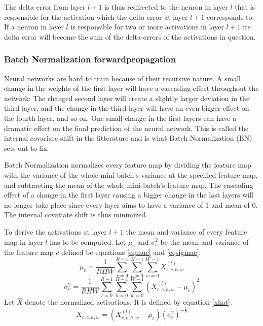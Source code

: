 \documentclass[a4paper,11pt,twoside]{article}
\begin{document}
The delta-error from layer $l+1$ is thus redirected to the neuron in layer $l$ that is responsible for the activation which the delta error at layer $l+1$ corresponds to. If a neuron in layer $l$ is responsible for two or more activations in layer $l+1$ its delta error will become the sum of the delta-errors of the activations in question. \cite{cs231n} \cite{convmath} \cite{webconv3}

\subsubsection{Batch Normalization forwardpropagation}
Neural networks are hard to train because of their recursive nature. A small change in the weights of the first layer will have a cascading effect throughout the network: The changed second layer will create a slightly larger deviation in the third layer, and the change in the third layer will have an even bigger effect on the fourth layer, and so on. One small change in the first layers can have a dramatic effect on the final prediction of the neural network. This is called  the internal covariate shift in the litterature and is what Batch Normalization (BN) sets out to fix. \cite{cs231n} \cite{batchnorm}

Batch Normalization normalizes every feature map by dividing the feature map with the variance of the whole mini-batch's variance at the specified feature map, and subtracting the mean of the whole mini-batch's feature map. The cascading effect of a change in the first layer causing a bigger change in the last layers will no longer take place since every layer aims to have a variance of 1 and mean of 0. The internal covatiate shift is thus minimized. \cite{cs231n} \cite{batchnorm}

To derive the activations at layer $l+1$ the mean and variance of every feature map in layer $l$ has to be computed. Let $\mu_c$ and $\sigma^2_c$ be the mean and variance of the feature map $c$ defined be equations \eqref{eqmuc} and \eqref{eqsigmac}: \cite{cs231n} \cite{batchnorm}
\begin{equation}\label{eqmuc}
\mu_c = \frac{1}{RHW} \sum^{R-1}_{r=0} \sum^{H-1}_{h=0} \sum^{W-1}_{w=0} X^{(l)}_{r,c,h,w}
\end{equation}
\begin{equation}\label{eqsigmac}
\sigma^2_c  = \frac{1}{RHW} \sum^{R-1}_{r=0} \sum^{H-1}_{h=0} \sum^{W-1}_{w=0} ({X^{(l)}_{r,c,h,w} - \mu_c})^2
\end{equation}
Let $\hat{X}$ denote the normalized activations. It is defined by equation \eqref{xhat}. \cite{cs231n} \cite{batchnorm}
\begin{equation}\label{xhat}
\hat{X}_{r,c,h,w} = (X^{(l)}_{r,c,h,w} - \mu_c){(\sigma^2_c)}^{-\frac{1}{2}}
\end{equation}
\end{document}
